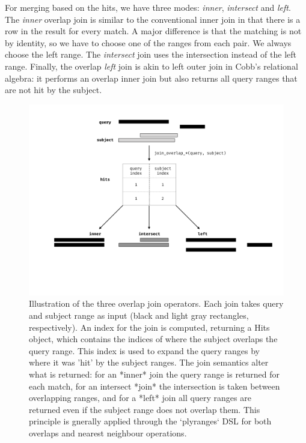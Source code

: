 \documentclass[10pt,letterpaper]{article}
\begin{document}
For merging based on the hits, we have three modes: \emph{inner},
\emph{intersect} and \emph{left}. The \emph{inner} overlap join is
similar to the conventional inner join in that there is a row in the
result for every match. A major difference is that the matching is not
by identity, so we have to choose one of the ranges from each pair. We
always choose the left range. The \emph{intersect} join uses the
intersection instead of the left range. Finally, the overlap \emph{left}
join is akin to left outer join in Cobb's relational algebra: it
performs an overlap inner join but also returns all query ranges that
are not hit by the subject.

\begin{figure}

{\centering \includegraphics[width=400pt]{diagrams/diagrams-002} 

}

\caption{Illustration of the three overlap join operators. Each join takes query and subject range as input (black and light gray rectangles, respectively). An index for the join is computed, returning a Hits object, which contains the indices of where the subject overlaps the query range. This index is used to expand the query ranges by where it was 'hit' by the subject ranges. The join semantics alter what is returned: for an *inner* join the query range is returned for each match, for an intersect *join* the intersection is taken between overlapping ranges, and for a *left* join all query ranges are returned even if the subject range does not overlap them. This principle is gnerally applied through the `plyranges` DSL for both overlaps and nearest neighbour operations.}\label{fig:olaps-fig}
\end{figure}
\end{document}
